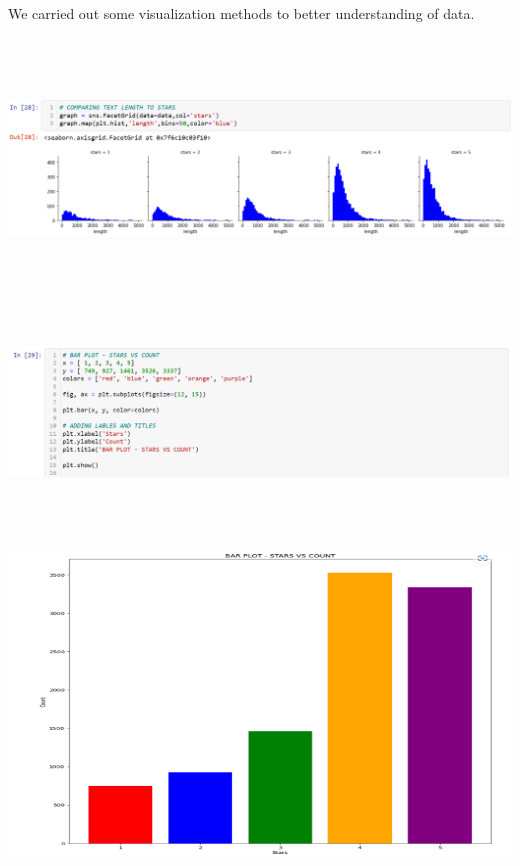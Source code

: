 \documentclass[a4paper, 12pt]{report}
\begin{document}
	\\
We carried out some visualization methods to better understanding of data.\\
	\includegraphics[height=3in,width=6in]{4}\\
	\includegraphics[height=2in,width=6in]{5}\\
	\includegraphics[height=4in,width=6in]{6}\\
\end{document}
